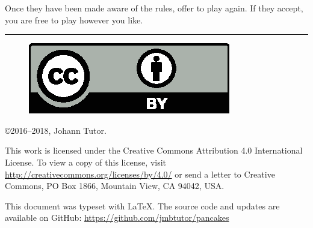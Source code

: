 \documentclass{article}
\begin{document}
Once they have been made aware of the rules, offer to play again. If they accept, you are free to play however you like.

\medskip
\hrule

{
  \small
  \begin{figure}
    \includegraphics[scale=0.5]{cc-by.eps}
  \end{figure}

  \copyright 2016--2018, Johann Tutor.

  This work is licensed under the Creative Commons Attribution 4.0
  International License. To view a copy of this license, visit
  \url{http://creativecommons.org/licenses/by/4.0/} or send a letter to Creative Commons, PO Box 1866, Mountain View, CA 94042, USA.

  This document was typeset with \LaTeX. The source code and updates are available on GitHub: \url{https://github.com/jmbtutor/pancakes}
}
\end{document}
